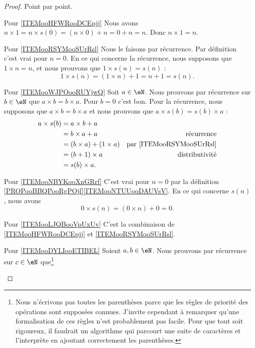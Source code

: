\begin{proof}
    Point par point.
    \begin{subproof}
    \item[Pour \ref{ITEMooHFWRooDCEpjj}]
        Nous avons \( n\times 1=n\times s(0)=(n\times 0)+n=0+n=n\). Donc \( n\times 1=n\). 
    \item[Pour \ref{ITEMooRSYMooSUrRsl}]
        Nous le faisons par récurrence. Par définition c'est vrai pour \( n=0\). En ce qui concerne la récurrence, nous supposons que \( 1\times n=n\), et nous prouvons que \( 1\times s(n)=s(n)\) :
        \begin{equation}
            1\times s(n)=(1\times n)+1=n+1=s(n).
        \end{equation}
    \item[Pour \ref{ITEMooWJPOooRUYjwQ}]
        Soit \( a\in \eN\). Nous prouvons par récurrence sur \( b\in \eN\) que \( a\times b=b\times a\). Pour \( b=0\) c'est bon. Pour la récurrence, nous supposons que \( a\times b=b\times a\) et nous prouvons que \( a\times s(b)=s(b)\times a\) :
        \begin{subequations}
            \begin{align}
                a\times s(b)&=a\times b+a\\
                &=b\times a+a   &\text{récurrence}\\
                &=(b\times a)+(1\times a) &\text{par \ref{ITEMooRSYMooSUrRsl}}\\
                &=(b+1)\times a&\text{distributivité}\\
                &=s(b)\times a.
            \end{align}
        \end{subequations}
    \item[Pour \ref{ITEMooNBYKooXnGRrf}]
        C'est vrai pour \( n=0\) par la définition \ref{PROPooBBQPooRgPOjf}\ref{ITEMooNTUUooDAUVsV}. En ce qui concerne \( s(n)\), nous avons
        \begin{equation}
            0\times s(n)=(0\times n)+0=0.
        \end{equation}
    \item[Pour \ref{ITEMooLJQBooVpUxUv}]
        C'est la combinaison de \ref{ITEMooHFWRooDCEpjj} et \ref{ITEMooRSYMooSUrRsl}.
    \item[Pour \ref{ITEMooDYLIooETIBEL}]
        Soient \( a,b\in \eN\). Nous prouvons par récurrence sur \( c\in \eN\) que\footnote{Nous n'écrivons pas toutes les parenthèses parce que les règles de priorité des opérations sont supposées connues. J'invite cependant  à remarquer qu'une formalisation de ces règles n'est probablement pas facile. Pour que tout soit rigoureux, il faudrait un algorithme qui parcourt une suite de caractères et l'interprète en ajoutant correctement les parenthèses.}

\end{subproof}
\end{proof}
